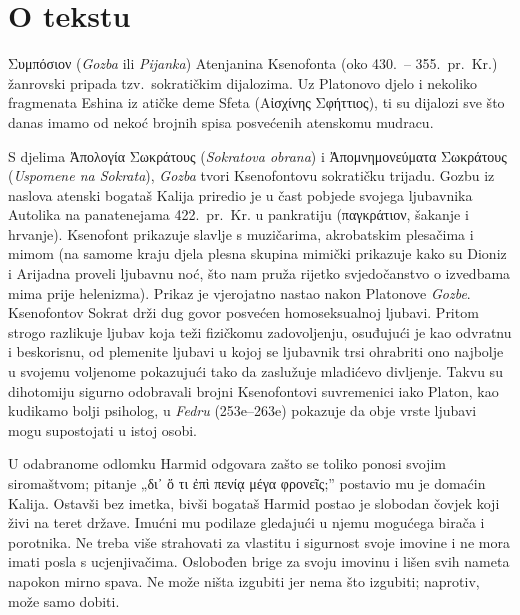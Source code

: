 

\section*{O tekstu}

\textgreek[variant=ancient]{Συμπόσιον} (\textit{Gozba} ili \textit{Pijanka}) Atenjanina Ksenofonta (oko 430.\ – 355.\ pr.~Kr.) žanrovski pripada tzv.\ sokratičkim dijalozima. Uz Platonovo djelo i nekoliko fragmenata Eshina iz atičke deme Sfeta \textgreek[variant=ancient]{(Αἰσχίνης Σφήττιος),} ti su dijalozi sve što danas imamo od nekoć brojnih spisa posvećenih atenskomu mudracu. 

S djelima \textgreek[variant=ancient]{Ἀπολογία Σωκράτους} (\textit{Sokratova obrana}) i \textgreek[variant=ancient]{Ἀπομνημονεύματα Σωκράτους} (\textit{Uspomene na Sokrata}), \textit{Gozba} tvori Ksenofontovu sokratičku trijadu. Gozbu iz naslova atenski bogataš Kalija priredio je u čast pobjede svojega ljubavnika Autolika na panatenejama 422.\ pr.~Kr. u pankratiju \textgreek[variant=ancient]{(παγκράτιον,} šakanje i hrvanje). Ksenofont prikazuje slavlje s muzičarima, akrobatskim plesačima i mimom (na samome kraju djela plesna skupina mimički prikazuje kako su Dioniz i Arijadna proveli ljubavnu noć, što nam pruža rijetko svjedočanstvo o izvedbama mima prije helenizma). Prikaz je vjerojatno nastao nakon Platonove \textit{Gozbe}. Ksenofontov Sokrat drži dug govor posvećen homoseksualnoj ljubavi. Pritom strogo razlikuje ljubav koja teži fizičkomu zadovoljenju, osuđujući je kao odvratnu i beskorisnu, od plemenite ljubavi u kojoj se ljubavnik trsi ohrabriti ono najbolje u svojemu voljenome pokazujući tako da zaslužuje mladićevo divljenje. Takvu su dihotomiju sigurno odobravali brojni Ksenofontovi suvremenici iako Platon, kao kudikamo bolji psiholog, u \textit{Fedru} (253e–263e) pokazuje da obje vrste ljubavi mogu supostojati u istoj osobi. 

U odabranome odlomku Harmid odgovara zašto se toliko ponosi svojim siromaštvom; pitanje „\textgreek[variant=ancient]{δι᾿ ὅ τι ἐπὶ πενίᾳ μέγα φρονεῖς;}” postavio mu je domaćin Kalija. Ostavši bez imetka, bivši bogataš Harmid postao je slobodan čovjek koji živi na teret države. Imućni mu podilaze gledajući u njemu mogućega birača i porotnika. Ne treba više strahovati za vlastitu i sigurnost svoje imovine i ne mora imati posla s ucjenjivačima. Oslobođen brige za svoju imovinu i lišen svih nameta napokon mirno spava. Ne može ništa izgubiti jer nema što izgubiti; naprotiv, može samo dobiti.

